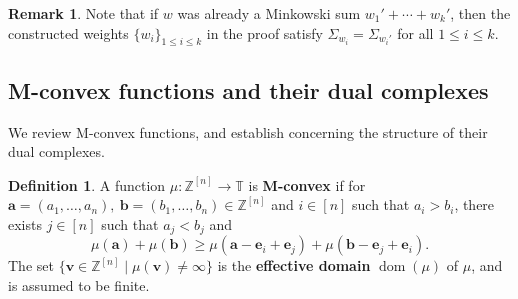 \documentclass[11pt]{amsart}
\newcommand{\ZZ}{\mathbb Z}
\newcommand{\TT}{\mathbb T}
\newcommand{\be}{\mathbf e}
\newcommand{\bv}{{\mathbf v}}
\theoremstyle{definition}
\newtheorem{defn}[thm]{Definition}
\newtheorem{rem}[thm]{Remark}
\newcommand{\chris}[1]{{\color{cyan} \sf Chris: [#1]}}
\begin{document}
\begin{rem}\label{rem:mixed}
Note that if $w$ was already a Minkowski sum $w_1'+\cdots+w_k'$, then the constructed weights $\{w_i\}_{1\leq i \leq k}$ in the proof satisfy $\Sigma_{w_i} = \Sigma_{w_i'}$ for all $1\leq i \leq k$.
\end{rem}



\subsection{M-convex functions and their dual complexes}
\label{subsec:mconvex}

We review M-convex functions, and establish  concerning the structure of their dual complexes.

\begin{defn}
A function $\mu: \ZZ^{[n]}\to \TT$ is \textbf{M-convex} if for $\mathbf a = (a_1, \ldots, a_n),\ {\mathbf{b} = (b_1, \ldots, b_n)} \in \ZZ^{[n]}$ and $i\in [n]$ such that $ a_i > b_i$, there exists $j\in [n]$ such that $ a_j <  b_j$ and
\begin{equation}\label{eqn:Mconvex}\tag{M}
\mu(\mathbf a) + \mu(\mathbf b) \geq \mu(\mathbf a - \be_i + \be_j) + \mu(\mathbf b-\be_j+\be_i).
\end{equation}
The set $\{\bv \in \ZZ^{[n]} \mid \mu( \bv) \neq \infty\}$ is the \textbf{effective domain} $\operatorname{dom}(\mu)$ of $\mu$, and is assumed to be finite.
\end{defn}
\end{document}
